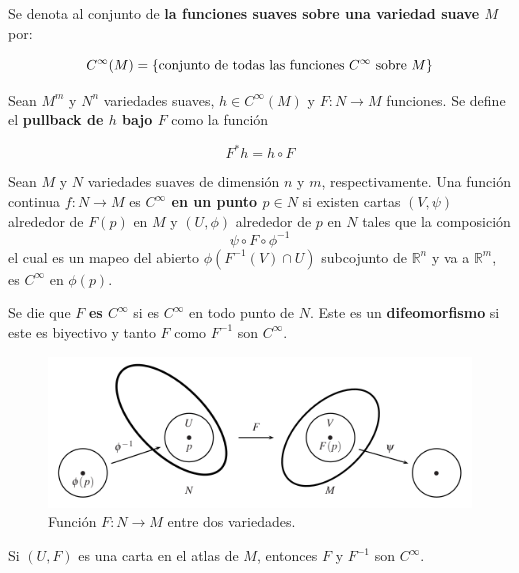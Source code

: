 \documentclass[12pt]{report}
\theoremstyle{largebreak}
\begin{document}
    Se denota al conjunto de \textbf{la funciones suaves sobre una variedad suave $M$} por:

    \begin{equation*}
        C^\infty(M)=\left\{\textup{conjunto de todas las funciones $C^\infty$ sobre $M$}\right\}
    \end{equation*}

    Sean $M^m$ y $N^n$ variedades suaves, $h\in C^\infty(M)$ y $F:N\rightarrow M$ funciones. Se define el \textbf{pullback de $h$ bajo $F$} como la función

    \begin{equation*}
        F^*h=h\circ F
    \end{equation*}

    \begin{mydef}
        Sean $M$ y $N$ variedades suaves  de dimensión $n$ y $m$, respectivamente. Una función continua $f:N\rightarrow M$ es \textbf{$C^\infty$ en un punto $p\in N$} si existen cartas $(V,\psi)$ alrededor de $F(p)$ en $M$ y $(U,\phi)$ alrededor de $p$ en $N$ tales que la composición
        \begin{equation*}
            \psi \circ F\circ \phi^{-1}
        \end{equation*}
        el cual es un mapeo del abierto $\phi(F^{-1}(V)\cap U)$ subcojunto de $\mathbb{R}^n$ y va a $\mathbb{R}^m$, es $C^\infty$ en $\phi(p)$.

        Se die que $F$ \textbf{es $C^\infty$} si es $C^\infty$ en todo punto de $N$. Este es un \textbf{difeomorfismo} si este es biyectivo y tanto $F$ como $F^{-1}$ son $C^\infty$.
    \end{mydef}

    \begin{figure}
        \includegraphics[scale = 0.75]{Pullback.png}
        \centering
        \caption{Función $F:N\rightarrow M$ entre dos variedades.}
    \end{figure}

    \begin{exa}
        Si $(U,F)$ es una carta en el atlas de $M$, entonces $F$ y $F^{-1}$ son $C^\infty$.
    \end{exa}
\end{document}
